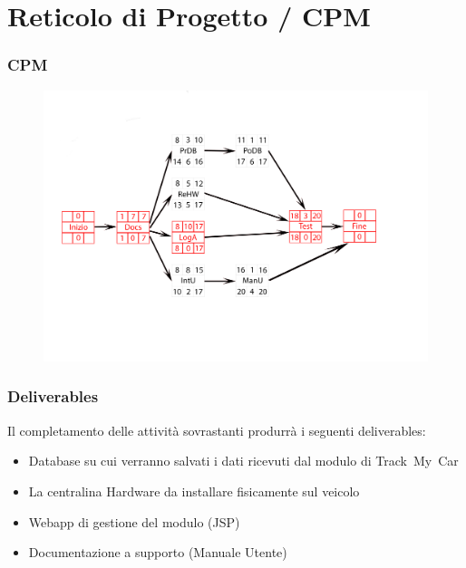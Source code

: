 \documentclass[a4paper,12pt]{beamer}
\begin{document}
\section{Reticolo di Progetto / CPM}
\begin{frame}
\frametitle{CPM}
\begin{figure}[htbp]
\centering
\includegraphics[trim={1cm 4.5cm 3.5cm 2.5cm}, clip, scale=0.6]{../ProjectPlan/CPM.png}
\end{figure}
\end{frame}

\begin{frame}
\frametitle{Deliverables}
Il completamento delle attività sovrastanti produrrà i seguenti deliverables:
\begin{itemize}
\item Database su cui verranno salvati i dati ricevuti dal modulo di Track~My~Car
\item La centralina Hardware da installare fisicamente sul veicolo
\item Webapp di gestione del modulo (JSP)
\item Documentazione a supporto (Manuale Utente)
\end{itemize}
\end{frame}

\pagebreak
\end{document}
